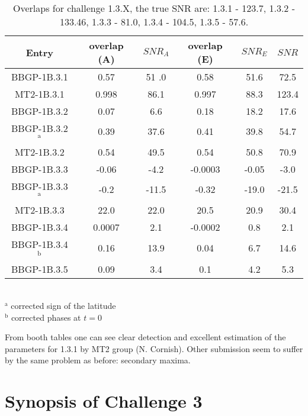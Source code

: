 \documentclass{iopart}
\begin{document}
\begin{table}
\caption{\label{EMRI2} Overlaps for challenge 1.3.X, the true SNR are: 1.3.1 - 123.7, 1.3.2 - 133.46, 1.3.3 - 81.0, 1.3.4 - 104.5, 1.3.5 - 57.6.} 
\begin{tabular}{|c|c|c|c|c|c|}
\hline
Entry & overlap (A) & $SNR_A$ &  overlap (E) & $SNR_E$ & $SNR$ \\
\hline
BBGP-1B.3.1 & 0.57 & 51 .0 & 0.58 & 51.6 & 72.5\\
MT2-1B.3.1  & 0.998 & 86.1 & 0.997 & 88.3 & 123.4\\
\hline
BBGP-1B.3.2 & 0.07 & 6.6 & 0.18 & 18.2 & 17.6\\
BBGP-1B.3.2$^\mathrm{a}$ & 0.39 & 37.6 & 0.41 & 39.8 & 54.7\\
MT2-1B.3.2  & 0.54 & 49.5 & 0.54 & 50.8 & 70.9 \\
\hline
BBGP-1B.3.3 & -0.06 & -4.2 & -0.0003 & -0.05 & -3.0 \\
BBGP-1B.3.3$^\mathrm{a}$ & -0.2 & -11.5 & -0.32 & -19.0 & -21.5\\
MT2-1B.3.3  & 22.0 &  22.0 & 20.5 & 20.9 & 30.4 \\
\hline
BBGP-1B.3.4 & 0.0007 & 2.1 & -0.0002 & 0.8 & 2.1\\
BBGP-1B.3.4$^\mathrm{b}$ & 0.16 & 13.9 & 0.04 & 6.7 & 14.6 \\ 
\hline
BBGP-1B.3.5 & 0.09 & 3.4 & 0.1 & 4.2 & 5.3\\
\hline
\end{tabular}\\
$^\mathrm{a}$ corrected sign of the latitude\\
$^\mathrm{b}$ corrected phases at $t=0$
\end{table}


From booth tables one can see clear detection and excellent estimation of the parameters for
1.3.1 by MT2 group (N. Cornish). Other submission seem to suffer by the same problem as before:
secondary maxima. 
 



\section{Synopsis of Challenge 3}
\end{document}
